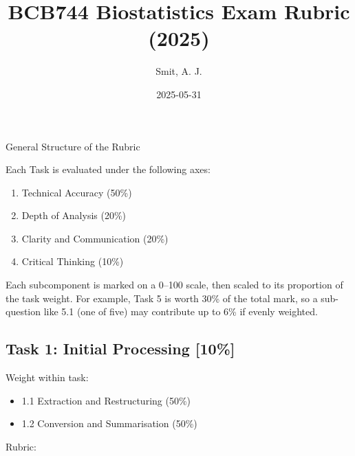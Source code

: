 \documentclass[
  10pt,
]{article}
\title{BCB744 Biostatistics Exam Rubric (2025)}
\author{Smit, A. J.}
\date{2025-05-31}
\providecommand{\tightlist}{%
  \setlength{\itemsep}{0pt}\setlength{\parskip}{0pt}}
\begin{document}
\maketitle


General Structure of the Rubric

Each Task is evaluated under the following axes:

\begin{enumerate}
\def\labelenumi{\arabic{enumi}.}
\tightlist
\item
  Technical Accuracy (50\%)
\item
  Depth of Analysis (20\%)
\item
  Clarity and Communication (20\%)
\item
  Critical Thinking (10\%)
\end{enumerate}

Each subcomponent is marked on a 0--100 scale, then scaled to its
proportion of the task weight. For example, Task 5 is worth 30\% of the
total mark, so a sub-question like 5.1 (one of five) may contribute up
to 6\% if evenly weighted.

\subsection{Task 1: Initial Processing
{[}10\%{]}}\label{task-1-initial-processing-10}

Weight within task:

\begin{itemize}
\tightlist
\item
  1.1 Extraction and Restructuring (50\%)
\item
  1.2 Conversion and Summarisation (50\%)
\end{itemize}

Rubric:
\end{document}
